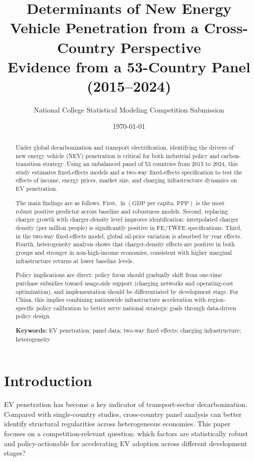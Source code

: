 \documentclass[a4paper,12pt]{article}
\title{Determinants of New Energy Vehicle Penetration from a Cross-Country Perspective\\
\large Evidence from a 53-Country Panel (2015--2024)}
\author{National College Statistical Modeling Competition Submission}
\date{\today}
\begin{document}
\maketitle

\begin{abstract}
Under global decarbonization and transport electrification, identifying the drivers of new energy vehicle (NEV) penetration is critical for both industrial policy and carbon-transition strategy. Using an unbalanced panel of 53 countries from 2015 to 2024, this study estimates fixed-effects models and a two-way fixed-effects specification to test the effects of income, energy prices, market size, and charging infrastructure dynamics on EV penetration.

The main findings are as follows. First, $\ln(\text{GDP per capita, PPP})$ is the most robust positive predictor across baseline and robustness models. Second, replacing charger growth with charger-density level improves identification: interpolated charger density (per million people) is significantly positive in FE/TWFE specifications. Third, in the two-way fixed-effects model, global oil-price variation is absorbed by year effects. Fourth, heterogeneity analysis shows that charger-density effects are positive in both groups and stronger in non-high-income economies, consistent with higher marginal infrastructure returns at lower baseline levels.

Policy implications are direct: policy focus should gradually shift from one-time purchase subsidies toward usage-side support (charging networks and operating-cost optimization), and implementation should be differentiated by development stage. For China, this implies combining nationwide infrastructure acceleration with region-specific policy calibration to better serve national strategic goals through data-driven policy design.

\textbf{Keywords:} EV penetration; panel data; two-way fixed effects; charging infrastructure; heterogeneity
\end{abstract}

\tableofcontents
\newpage

\section{Introduction}
EV penetration has become a key indicator of transport-sector decarbonization. Compared with single-country studies, cross-country panel analysis can better identify structural regularities across heterogeneous economies. This paper focuses on a competition-relevant question: which factors are statistically robust and policy-actionable for accelerating EV adoption across different development stages?
\end{document}
